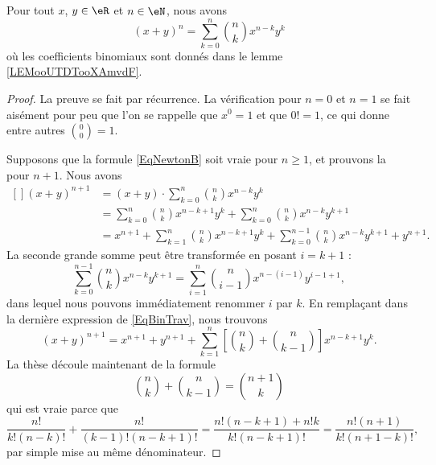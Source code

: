 \begin{proposition}     \label{PropBinomFExOiL}
	Pour tout \( x\), \( y\in\eR\) et \( n\in\eN\), nous avons
	\begin{equation}        \label{EqNewtonB}
		(x+y)^n=\sum_{k=0}^n{n\choose k}x^{n-k}y^k
	\end{equation}
	où les coefficients binomiaux sont donnés dans le lemme \ref{LEMooUTDTooXAmvdF}.
\end{proposition}

\begin{proof}
	La preuve se fait par récurrence. La vérification pour \( n=0\) et \( n=1\) se fait aisément pour peu que l'on se rappelle que \( x^0=1\) et que \( 0!=1\), ce qui donne entre autres \( {0\choose 0}=1\).

	Supposons que la formule \eqref{EqNewtonB} soit vraie pour \( n\geq1\), et prouvons la pour \( n+1\). Nous avons
	\begin{equation}        \label{EqBinTrav}
		\begin{aligned}[]
			(x+y)^{n+1} & = (x+y)\cdot \sum_{k=0}^n{n\choose k}x^{n-k}y^k                                                     \\
			            & = \sum_{k=0}^n{n\choose k}x^{n-k+1}y^k+\sum_{k=0}^n{n\choose k}x^{n-k}y^{k+1}                       \\
			            & = x^{n+1}+ \sum_{k=1}^n{n\choose k}x^{n-k+1}y^k+\sum_{k=0}^{n-1}{n\choose k}x^{n-k}y^{k+1}+y^{n+1}.
		\end{aligned}
	\end{equation}
	La seconde grande somme peut être transformée en posant \( i=k+1\) :
	\begin{equation}
		\sum_{k=0}^{n-1}{n\choose k}x^{n-k}y^{k+1} = \sum_{i=1}^n{n\choose i-1}x^{n-(i-1)}y^{i-1+1},
	\end{equation}
	dans lequel nous pouvons immédiatement renommer \( i\) par \( k\). En remplaçant dans la dernière expression de \eqref{EqBinTrav}, nous trouvons
	\begin{equation}
		(x+y)^{n+1}=x^{n+1}+y^{n+1}+\sum_{k=1}^n\left[ {n\choose k}+{n\choose k-1} \right]x^{n-k+1}y^k.
	\end{equation}
	La thèse découle maintenant de la formule
	\begin{equation}
		{n\choose k}+{n\choose k-1}={n+1\choose k}
	\end{equation}
	qui est vraie parce que
	\begin{equation}
		\frac{ n! }{ k!(n-k)! }+\frac{ n! }{ (k-1)!(n-k+1)! }=\frac{ n!(n-k+1)+n!k }{ k!(n-k+1)! }=\frac{ n!(n+1) }{  k!(n+1-k)!  },
	\end{equation}
	par simple mise au même dénominateur.
\end{proof}

